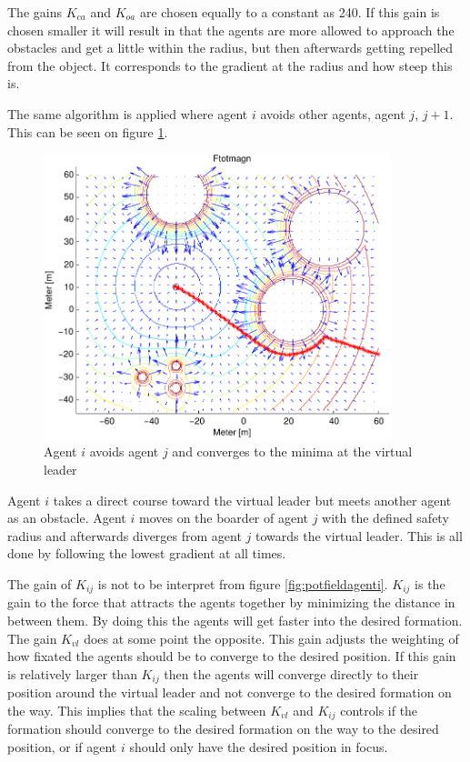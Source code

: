 The gains $K_{ca}$ and $K_{oa}$ are chosen equally to a constant as
240. If this gain is chosen smaller it will result in that the agents
are more allowed to approach the obstacles and get a little within the
radius, but then afterwards getting repelled from the object. It
corresponds to the gradient at the radius and how steep this is.

The same algorithm is applied where agent $i$ avoids other agents, agent $j$, $j+1$. This can be seen on figure \ref{fig:avoidagent}.
\begin{figure}[htbp]
  \includegraphics[width=0.9\textwidth]{fig/ftotmagnfigpdf}
  \caption{Agent $i$ avoids agent $j$ and converges to the minima at the virtual leader}
  \label{fig:avoidagent}
\end{figure}
Agent $i$ takes a direct course toward the virtual leader but meets
another agent as an obstacle. Agent $i$ moves on the boarder of agent
$j$ with the defined safety radius and afterwards diverges from agent
$j$ towards the virtual leader. This is all done by following the
lowest gradient at all times.

The gain of $K_{ij}$ is not to be interpret from figure
\ref{fig:potfieldagenti}. $K_{ij}$ is the gain to the force that
attracts the agents together by minimizing the distance in between
them. By doing this the agents will get faster into the desired
formation. The gain $K_{vl}$ does at some point the opposite. This
gain adjusts the weighting of how fixated the agents should be to
converge to the desired position. If this gain is relatively larger
than $K_{ij}$ then the agents will converge directly to their position
around the virtual leader and not converge to the desired formation on
the way. This implies that the scaling between $K_{vl}$ and $K_{ij}$
controls if the formation should converge to the desired formation on
the way to the desired position, or if agent $i$ should only have the
desired position in focus.

